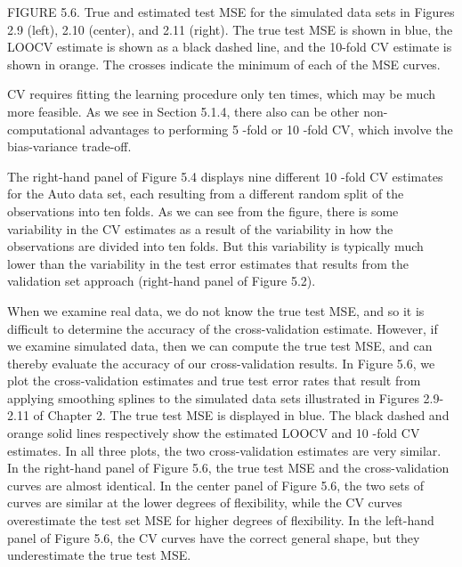 \documentclass[10pt]{article}
\begin{document}
FIGURE 5.6. True and estimated test MSE for the simulated data sets in Figures 2.9 (left), 2.10 (center), and 2.11 (right). The true test MSE is shown in blue, the LOOCV estimate is shown as a black dashed line, and the 10-fold CV estimate is shown in orange. The crosses indicate the minimum of each of the MSE curves.

CV requires fitting the learning procedure only ten times, which may be much more feasible. As we see in Section 5.1.4, there also can be other non-computational advantages to performing 5 -fold or 10 -fold CV, which involve the bias-variance trade-off.

The right-hand panel of Figure 5.4 displays nine different 10 -fold CV estimates for the Auto data set, each resulting from a different random split of the observations into ten folds. As we can see from the figure, there is some variability in the CV estimates as a result of the variability in how the observations are divided into ten folds. But this variability is typically much lower than the variability in the test error estimates that results from the validation set approach (right-hand panel of Figure 5.2).

When we examine real data, we do not know the true test MSE, and so it is difficult to determine the accuracy of the cross-validation estimate. However, if we examine simulated data, then we can compute the true test MSE, and can thereby evaluate the accuracy of our cross-validation results. In Figure 5.6, we plot the cross-validation estimates and true test error rates that result from applying smoothing splines to the simulated data sets illustrated in Figures 2.9-2.11 of Chapter 2. The true test MSE is displayed in blue. The black dashed and orange solid lines respectively show the estimated LOOCV and 10 -fold CV estimates. In all three plots, the two cross-validation estimates are very similar. In the right-hand panel of Figure 5.6, the true test MSE and the cross-validation curves are almost identical. In the center panel of Figure 5.6, the two sets of curves are similar at the lower degrees of flexibility, while the CV curves overestimate the test set MSE for higher degrees of flexibility. In the left-hand panel of Figure 5.6, the CV curves have the correct general shape, but they underestimate the true test MSE.
\end{document}
